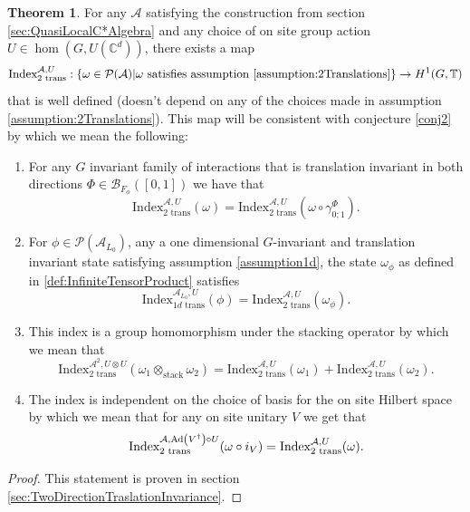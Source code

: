 \documentclass[12pt,a4paper,twoside]{article}
\let\originalleft\left
\let\originalright\right
\renewcommand{\left}{\mathopen{}\mathclose\bgroup\originalleft}
\renewcommand{\right}{\aftergroup\egroup\originalright}
\newcommand{\BB}{\mathcal B}
\newcommand{\PP}{\mathcal P}
\newcommand{\CC}{\mathbb C}
\newcommand{\TT}{\mathbb T}
\renewcommand{\AA}{\mathcal A}
\newcommand{\Ad}[1]{\textrm{Ad}\left(#1\right)}
\theoremstyle{definition}
\newtheorem{theorem}{Theorem}[section]
\numberwithin{equation}{section}
\begin{document}
\begin{theorem}\label{thrm:ExistenceSecondIndex}
	For any $\AA$ satisfying the construction from section \ref{sec:QuasiLocalC*Algebra} and any choice of on site group action $U\in\hom(G,U(\CC^d))$, there exists a map
	\begin{equation}
		\textrm{Index}^{\AA,U}_{2\text{ trans}}:\{\omega\in\PP(\AA)| \omega\text{ satisfies assumption \ref{assumption:2Translations}}\}\rightarrow H^1(G,\TT)
	\end{equation}
	that is well defined (doesn't depend on any of the choices made in assumption \ref{assumption:2Translations}). This map will be consistent with conjecture \ref{conj2} by which we mean the following:
	\begin{enumerate}
		\item For any $G$ invariant family of interactions that is translation invariant in both directions $\Phi\in\BB_{F_\phi}([0,1])$ we have that
		\begin{equation}
			\textrm{Index}^{\AA,U}_{2\text{ trans}}(\omega)=\textrm{Index}^{\AA,U}_{2\text{ trans}}(\omega\circ\gamma^\Phi_{0;1}).
		\end{equation}
		\item For $\phi\in\PP(\AA_{L_0})$, any a one dimensional $G$-invariant and translation invariant state satisfying assumption \ref{assumption1d}, the state $\omega_\phi$ as defined in \ref{def:InfiniteTensorProduct} satisfies
		\begin{equation}
			\textrm{Index}^{\AA_{L_0},U}_{1d\text{ trans}}(\phi)=\text{Index}^{\AA,U}_{2\text{ trans}}(\omega_\phi).
		\end{equation}
		\item This index is a group homomorphism under the stacking operator by which we mean that
		\begin{equation}
			\textrm{Index}_{\text{2 trans}}^{\AA^2,U\otimes U}(\omega_1\otimes_{\text{stack}}\omega_2)=\textrm{Index}_{\text{2 trans}}^{\AA,U}(\omega_1)+\textrm{Index}_{\text{2 trans}}^{\AA,U}(\omega_2).
		\end{equation}
		\item The index is independent on the choice of basis for the on site Hilbert space by which we mean that for any on site unitary $V$ we get that
		\begin{equation}
			\textrm{Index}^{\AA,\Ad{V^\dagger}\circ U}_{\text{2 trans}}(\omega\circ i_V) =\textrm{Index}^{\AA,U}_{\text{2 trans}}(\omega).
		\end{equation}
	\end{enumerate}
\end{theorem}
\begin{proof}
	This statement is proven in section \ref{sec:TwoDirectionTraslationInvariance}.
\end{proof}
\end{document}

